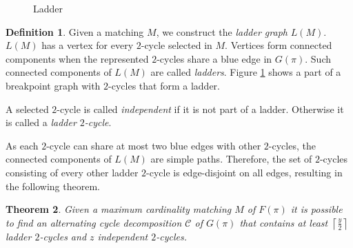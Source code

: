 \documentclass[11pt,DIV=11]{scrartcl}
\newtheorem{theorem}{Theorem}[section]
\theoremstyle{definition}
\newtheorem{definition}[theorem]{Definition}
\theoremstyle{remark}
\begin{document}
\begin{figure}
    \centering
    \caption{Ladder}
    \label{fig:ladder}
\end{figure}

\begin{definition}
Given a matching $M$, we construct the \textit{ladder graph} $L(M)$. $L(M)$ has a vertex for every $2$-cycle selected in $M$. Vertices form connected components when the represented $2$-cycles share a blue edge in $G(\pi)$. Such connected components of $L(M)$ are called \textit{ladders}. Figure \ref{fig:ladder} shows a part of a breakpoint graph with $2$-cycles that form a ladder.

A selected $2$-cycle is called \textit{independent} if it is not part of a ladder. Otherwise it is called a \textit{ladder $2$-cycle}.
\end{definition}

As each $2$-cycle can share at most two blue edges with other $2$-cycles, the connected components of $L(M)$ are simple paths. Therefore, the set of $2$-cycles consisting of every other ladder $2$-cycle is edge-disjoint on all edges, resulting in the following theorem.

\begin{theorem}
\label{thm:5}
Given a maximum cardinality matching $M$ of $F(\pi)$ it is possible to find an alternating cycle decomposition $\mathcal{C}$ of $G(\pi)$ that contains at least $\left\lceil \frac{y}{2} \right\rceil$ ladder $2$-cycles and $z$ independent $2$-cycles.
\end{theorem}
\end{document}
